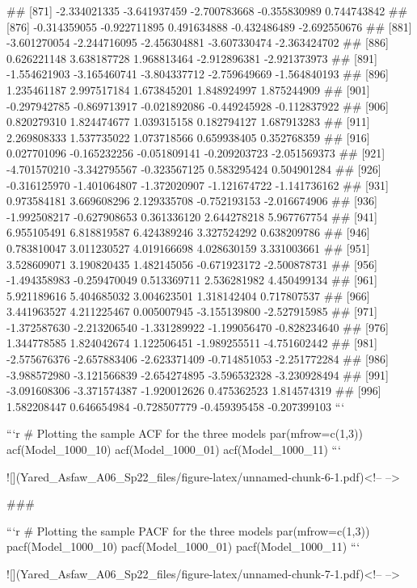 \documentclass[
]{article}
\begin{document}
\begin{enumerate}[label=(\alph*)]
##  [871] -2.334021335 -3.641937459 -2.700783668 -0.355830989  0.744743842
##  [876] -0.314359055 -0.922711895  0.491634888 -0.432486489 -2.692550676
##  [881] -3.601270054 -2.244716095 -2.456304881 -3.607330474 -2.363424702
##  [886]  0.626221148  3.638187728  1.968813464 -2.912896381 -2.921373973
##  [891] -1.554621903 -3.165460741 -3.804337712 -2.759649669 -1.564840193
##  [896]  1.235461187  2.997517184  1.673845201  1.848924997  1.875244909
##  [901] -0.297942785 -0.869713917 -0.021892086 -0.449245928 -0.112837922
##  [906]  0.820279310  1.824474677  1.039315158  0.182794127  1.687913283
##  [911]  2.269808333  1.537735022  1.073718566  0.659938405  0.352768359
##  [916]  0.027701096 -0.165232256 -0.051809141 -0.209203723 -2.051569373
##  [921] -4.701570210 -3.342795567 -0.323567125  0.583295424  0.504901284
##  [926] -0.316125970 -1.401064807 -1.372020907 -1.121674722 -1.141736162
##  [931]  0.973584181  3.669608296  2.129335708 -0.752193153 -2.016674906
##  [936] -1.992508217 -0.627908653  0.361336120  2.644278218  5.967767754
##  [941]  6.955105491  6.818819587  6.424389246  3.327524292  0.638209786
##  [946]  0.783810047  3.011230527  4.019166698  4.028630159  3.331003661
##  [951]  3.528609071  3.190820435  1.482145056 -0.671923172 -2.500878731
##  [956] -1.494358983 -0.259470049  0.513369711  2.536281982  4.450499134
##  [961]  5.921189616  5.404685032  3.004623501  1.318142404  0.717807537
##  [966]  3.441963527  4.211225467  0.005007945 -3.155139800 -2.527915985
##  [971] -1.372587630 -2.213206540 -1.331289922 -1.199056470 -0.828234640
##  [976]  1.344778585  1.824042674  1.122506451 -1.989255511 -4.751602442
##  [981] -2.575676376 -2.657883406 -2.623371409 -0.714851053 -2.251772284
##  [986] -3.988572980 -3.121566839 -2.654274895 -3.596532328 -3.230928494
##  [991] -3.091608306 -3.371574387 -1.920012626  0.475362523  1.814574319
##  [996]  1.582208447  0.646654984 -0.728507779 -0.459395458 -0.207399103
```


```r
# Plotting the sample ACF for the three models
par(mfrow=c(1,3))
acf(Model_1000_10)
acf(Model_1000_01)
acf(Model_1000_11)
```

![](Yared_Asfaw_A06_Sp22_files/figure-latex/unnamed-chunk-6-1.pdf)<!-- --> 

### 


```r
# Plotting the sample PACF for the three models
par(mfrow=c(1,3))
pacf(Model_1000_10)
pacf(Model_1000_01)
pacf(Model_1000_11)
```

![](Yared_Asfaw_A06_Sp22_files/figure-latex/unnamed-chunk-7-1.pdf)<!-- --> 


\end{enumerate}
\end{document}
